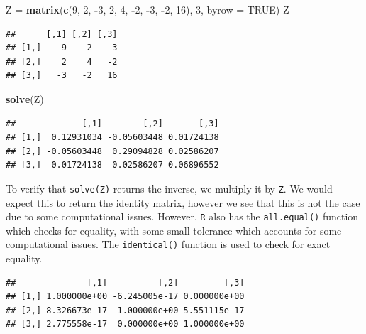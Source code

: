 \documentclass[]{book}
\newenvironment{Shaded}{\begin{snugshade}}{\end{snugshade}}
\newcommand{\KeywordTok}[1]{\textcolor[rgb]{0.13,0.29,0.53}{\textbf{#1}}}
\newcommand{\DataTypeTok}[1]{\textcolor[rgb]{0.13,0.29,0.53}{#1}}
\newcommand{\DecValTok}[1]{\textcolor[rgb]{0.00,0.00,0.81}{#1}}
\newcommand{\StringTok}[1]{\textcolor[rgb]{0.31,0.60,0.02}{#1}}
\newcommand{\OtherTok}[1]{\textcolor[rgb]{0.56,0.35,0.01}{#1}}
\newcommand{\OperatorTok}[1]{\textcolor[rgb]{0.81,0.36,0.00}{\textbf{#1}}}
\newcommand{\NormalTok}[1]{#1}
\theoremstyle{definition}
\theoremstyle{definition}
\theoremstyle{definition}
\theoremstyle{remark}
\begin{document}
\begin{Shaded}
\begin{Highlighting}[]
\NormalTok{Z =}\StringTok{ }\KeywordTok{matrix}\NormalTok{(}\KeywordTok{c}\NormalTok{(}\DecValTok{9}\NormalTok{, }\DecValTok{2}\NormalTok{, }\OperatorTok{-}\DecValTok{3}\NormalTok{, }\DecValTok{2}\NormalTok{, }\DecValTok{4}\NormalTok{, }\OperatorTok{-}\DecValTok{2}\NormalTok{, }\OperatorTok{-}\DecValTok{3}\NormalTok{, }\OperatorTok{-}\DecValTok{2}\NormalTok{, }\DecValTok{16}\NormalTok{), }\DecValTok{3}\NormalTok{, }\DataTypeTok{byrow =} \OtherTok{TRUE}\NormalTok{)}
\NormalTok{Z}
\end{Highlighting}
\end{Shaded}

\begin{verbatim}
##      [,1] [,2] [,3]
## [1,]    9    2   -3
## [2,]    2    4   -2
## [3,]   -3   -2   16
\end{verbatim}

\begin{Shaded}
\begin{Highlighting}[]
\KeywordTok{solve}\NormalTok{(Z)}
\end{Highlighting}
\end{Shaded}

\begin{verbatim}
##             [,1]        [,2]       [,3]
## [1,]  0.12931034 -0.05603448 0.01724138
## [2,] -0.05603448  0.29094828 0.02586207
## [3,]  0.01724138  0.02586207 0.06896552
\end{verbatim}

To verify that \texttt{solve(Z)} returns the inverse, we multiply it by
\texttt{Z}. We would expect this to return the identity matrix, however
we see that this is not the case due to some computational issues.
However, \texttt{R} also has the \texttt{all.equal()} function which
checks for equality, with some small tolerance which accounts for some
computational issues. The \texttt{identical()} function is used to check
for exact equality.

\begin{Shaded}
\end{Shaded}

\begin{verbatim}
##              [,1]          [,2]         [,3]
## [1,] 1.000000e+00 -6.245005e-17 0.000000e+00
## [2,] 8.326673e-17  1.000000e+00 5.551115e-17
## [3,] 2.775558e-17  0.000000e+00 1.000000e+00
\end{verbatim}
\end{document}

